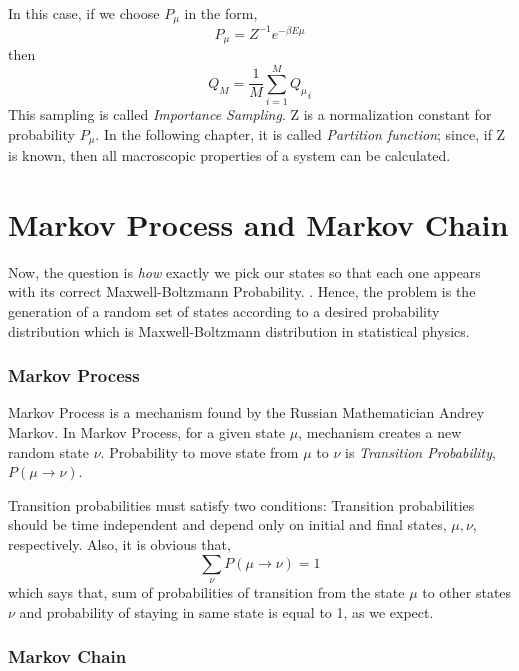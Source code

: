\documentclass[12pt,fleqn]{report}
\begin{document}
In this case, if we choose $P_\mu$ in the form,
\begin{equation}
P_\mu = Z^{-1} e^{-\beta E \mu} 
\end{equation}
then 
\begin{equation}
Q_M = \frac{1}{M} \sum\limits_{i=1}^M {Q_\mu}_i 
\end{equation}
 This sampling is called \textit{Importance Sampling}. Z is a normalization constant for probability $P_\mu$. In the following chapter, it is called \textit{Partition function}; since, if Z is known, then all macroscopic properties of a system can be calculated.

\section{Markov Process and Markov Chain} 

Now, the question is \textit{how} exactly we pick our states so that each one appears with its correct Maxwell-Boltzmann Probability. \cite[p. 34]{newman}. Hence, the problem is the generation of a random set of states according to a desired probability distribution which is Maxwell-Boltzmann distribution in statistical physics. 

\subsubsection{Markov Process}

Markov Process is a mechanism found by the Russian Mathematician Andrey Markov. In Markov Process, for a given state $\mu$, mechanism creates a new random state $\nu$. Probability to move state from $\mu$ to $\nu$ is \textit{Transition Probability}, $ P(\mu \rightarrow \nu) $.

Transition probabilities must satisfy two conditions:
Transition probabilities should be time independent and depend only on initial and final states, $\mu, \nu$, respectively. Also, it is obvious that,
\begin{equation}
\sum\limits_{\nu} P(\mu \rightarrow \nu) = 1 
\end{equation} 
which says that, sum of probabilities of transition from the state $\mu$ to other states $\nu$ and probability of staying in same state is equal to 1, as we expect.

\subsubsection{Markov Chain}
\end{document}
